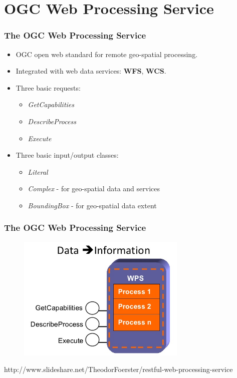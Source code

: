 \documentclass{beamer}
\begin{document}
\section{OGC Web Processing Service}

\begin{frame}
\frametitle<presentation>{The OGC Web Processing Service}

\begin{itemize}
\item OGC open web standard for remote geo-spatial processing.
\item Integrated with web data services: \textbf{WFS}, \textbf{WCS}.
\item Three basic requests:
\begin{itemize}   
      \item  \textit{GetCapabilities}
      \item  \textit{DescribeProcess}
      \item  \textit{Execute}
\end{itemize}
\item Three basic input/output classes:
\begin{itemize}   
      \item  \textit{Literal}
      \item  \textit{Complex} - for geo-spatial data and services
      \item  \textit{BoundingBox} - for geo-spatial data extent
\end{itemize}
\end{itemize}
\end{frame}



\begin{frame}
\frametitle<presentation>{The OGC Web Processing Service}

  \begin{figure}[ht]
   \centering
   \includegraphics[height=6cm]{figures/WPS}
  \end{figure}

\centering
\footnotesize{http://www.slideshare.net/TheodorFoerster/restful-web-processing-service}

\end{frame}
\end{document}
